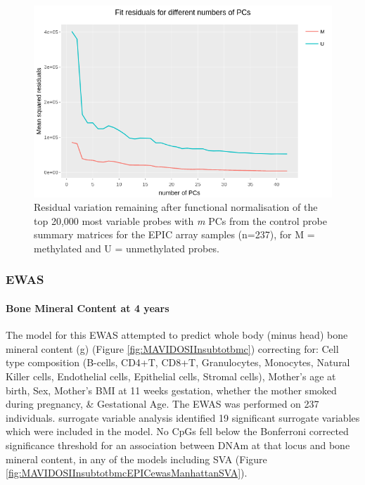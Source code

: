 \documentclass[
]{book}
\begin{document}
\begin{figure}

{\centering \includegraphics[width=0.8\linewidth]{figs/MAVIDOS-II-funnormPCsEPIC} 

}

\caption{Residual variation remaining after functional normalisation of the top 20,000 most variable probes with \emph{m} PCs from the control probe summary matrices for the EPIC array samples (n=237), for M = methylated and U = unmethylated probes.}\label{fig:MAVIDOSIIfunnormPCsEPIC}
\end{figure}



\hypertarget{ewas}{%
\subsubsection{EWAS}\label{ewas}}

\hypertarget{bone-mineral-content-at-4-years}{%
\paragraph{Bone Mineral Content at 4 years}\label{bone-mineral-content-at-4-years}}

The model for this EWAS attempted to predict whole body (minus head) bone mineral content (g) (Figure \ref{fig:MAVIDOSIInsubtotbmc}) correcting for: Cell type composition (B-cells, CD4+T, CD8+T, Granulocytes, Monocytes, Natural Killer cells, Endothelial cells, Epithelial cells, Stromal cells), Mother's age at birth, Sex, Mother's BMI at 11 weeks gestation, whether the mother smoked during pregnancy, \& Gestational Age.
The EWAS was performed on 237 individuals.
surrogate variable analysis identified 19 significant surrogate variables which were included in the model.
No CpGs fell below the Bonferroni corrected significance threshold for an association between DNAm at that locus and bone mineral content, in any of the models including SVA (Figure \ref{fig:MAVIDOSIInsubtotbmcEPICewasManhattanSVA}).
\end{document}
